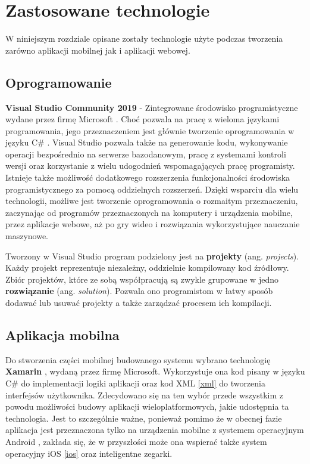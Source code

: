 \chapter{Zastosowane technologie}\label{chap:zastosowane-technologie}
W niniejszym rozdziale opisane zostały technologie użyte podczas tworzenia zarówno aplikacji mobilnej jak i aplikacji webowej.
\section{Oprogramowanie}
\textbf{Visual Studio Community 2019}\cite{visual-studio} - Zintegrowane środowisko programistyczne wydane przez firmę Microsoft \cite{microsoft}. Choć pozwala na pracę z wieloma językami programowania, jego przeznaczeniem jest głównie tworzenie oprogramowania w języku C\# \cite{csharp}. Visual Studio pozwala także na generowanie kodu, wykonywanie operacji bezpośrednio na serwerze bazodanowym, pracę z systemami kontroli wersji oraz korzystanie z wielu udogodnień wspomagających pracę programisty. Istnieje także możliwość dodatkowego rozszerzenia funkcjonalności środowiska programistycznego za pomocą oddzielnych rozszerzeń. Dzięki wsparciu dla wielu technologii, możliwe jest tworzenie oprogramowania o rozmaitym przeznaczeniu, zaczynając od programów przeznaczonych na komputery i urządzenia mobilne, przez aplikacje webowe, aż po gry wideo i rozwiązania wykorzystujące nauczanie maszynowe.

Tworzony w Visual Studio program podzielony jest na \textbf{projekty} (ang. \textit{projects}). Każdy projekt reprezentuje niezależny, oddzielnie kompilowany kod źródłowy. Zbiór projektów, które ze sobą współpracują są zwykle grupowane w jedno \textbf{rozwiązanie} (ang. \textit{solution}). Pozwala ono programistom w łatwy sposób dodawać lub usuwać projekty a także zarządzać procesem ich kompilacji.

\section{Aplikacja mobilna}
Do stworzenia części mobilnej budowanego systemu wybrano technologię \textbf{Xamarin} \cite{xamarin_docs}, wydaną przez firmę Microsoft. Wykorzystuje ona kod pisany w języku C\# do implementacji logiki aplikacji oraz kod XML \ref{xml} do tworzenia interfejsów użytkownika. Zdecydowano się na ten wybór przede wszystkim z powodu możliwości budowy aplikacji wieloplatformowych, jakie udostępnia ta technologia. Jest to szczególnie ważne, ponieważ pomimo że w obecnej fazie aplikacja jest przeznaczona tylko na urządzenia mobilne z systemem operacyjnym Android \cite{android}, zakłada się, że w przyszłości może ona wspierać także system operacyjny iOS \ref{ios} oraz inteligentne zegarki.

